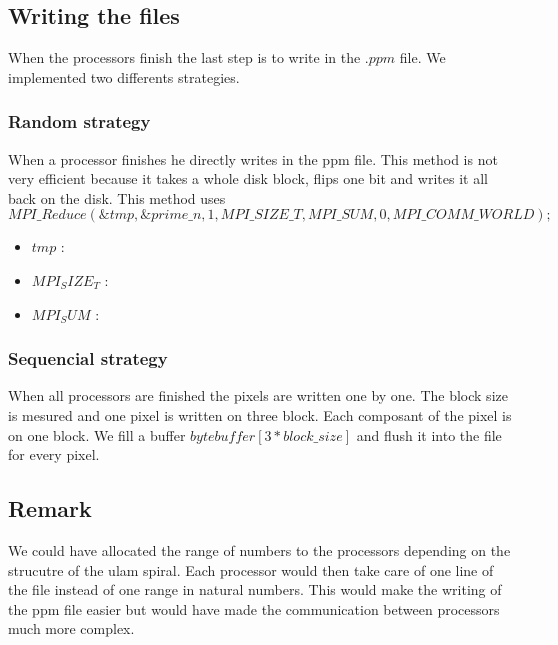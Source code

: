 \subsection{Writing the files}
When the processors finish the last step is to write in the $.ppm$ file. We implemented two differents strategies.

\subsubsection{Random strategy}
When a processor finishes he directly writes in the ppm file. This method is not very efficient because it takes a whole disk block, flips one bit and writes it all back on the disk. This method uses $$MPI\_Reduce(\&tmp, \&prime\_n, 1, MPI\_SIZE\_T, MPI\_SUM, 0, MPI\_COMM\_WORLD);$$  

\begin{itemize}

	\item{$tmp$ :}
	\item{$MPI_SIZE_T$ :}
	\item{$MPI_SUM$ :} 

\end{itemize}

\subsubsection{Sequencial strategy}
When all processors are finished the pixels are written one by one. The block size is mesured and one pixel is written on three block. Each composant of the pixel is on one block. We fill a buffer $byte buffer[3*block\_size]$ and flush it into the file for every pixel.

\subsection{Remark}
We could have allocated the range of numbers to the processors depending on the strucutre of the ulam spiral. Each processor would then take care of one line of the file instead of one range in natural numbers. This would make the writing of the ppm file easier but would have made the communication between processors much more complex.